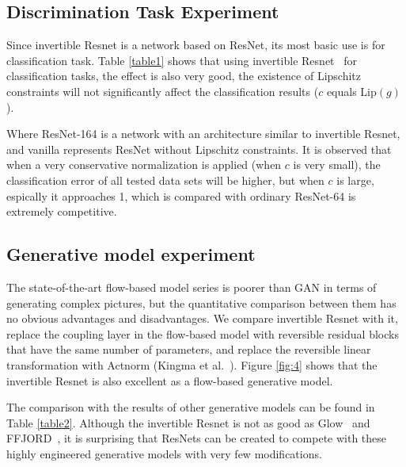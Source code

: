 \documentclass[final]{cvpr}
\begin{document}



\subsection{Discrimination Task Experiment}
Since invertible Resnet is a network based on ResNet, its most basic use is for classification task. Table \ref{table1} shows that using invertible Resnet~\cite{behrmann2019invertible} for classification tasks, the effect is also very good, the existence of Lipschitz constraints will not significantly affect the classification results ($c$ equals $\text{Lip}(g)$).


Where ResNet-164 is a network with an architecture similar to invertible Resnet, and vanilla represents ResNet without Lipschitz constraints. It is observed that when a very conservative normalization is applied (when $c$ is very small), the classification error of all tested data sets will be higher, but when $c$ is large, espically it approaches 1, which is compared with ordinary ResNet-64 is extremely competitive.

\subsection{Generative model experiment}
The state-of-the-art flow-based model series is poorer than GAN in terms of generating complex pictures, but the quantitative comparison between them has no obvious advantages and disadvantages. We compare invertible Resnet with it, replace the coupling layer in the flow-based model with reversible residual blocks that have the same number of parameters, and replace the reversible linear transformation with Actnorm (Kingma et al.~\cite{kingma2018glow}). Figure \ref{fig:4} shows that the invertible Resnet is also excellent as a flow-based generative model.

The comparison with the results of other generative models can be found in Table \ref{table2}. Although the invertible Resnet is not as good as Glow~\cite{kingma2018glow} and FFJORD~\cite{grathwohl2019scalable}, it is surprising that ResNets can be created to compete with these highly engineered generative models with very few modifications.


\end{document}
